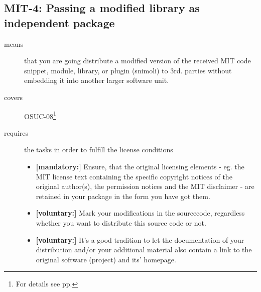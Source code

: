 \subsection{MIT-4: Passing a modified library as independent package}
\label{OSUC-08-MIT}
\begin{description}
\item[means] that you are going distribute a modified version of the received
MIT code snippet, module, library, or plugin (snimoli) to 3rd. parties without
embedding it into another larger software unit.
\item[covers] OSUC-08\footnote{For details see pp. \pageref{OSUC-08-DEF}}
\item[requires] the tasks in order to fulfill the license conditions
\begin{itemize}
  \item \textbf{[mandatory:]} Ensure, that the original licensing elements - eg.
  the MIT license text containing the specific copyright notices of the original
  author(s), the permission notices and the MIT disclaimer - are retained in
  your package in the form you have got them.
  \item \textbf{[voluntary:]} Mark your modifications in the sourcecode,
  regardless whether you want to distribute this source code or not.
  \item \textbf{[voluntary:]} It's a good tradition to let the documentation of
  your distribution and/or your additional material also contain a link to the
  original software (project) and its' homepage.
\end{itemize}
\end{description}


